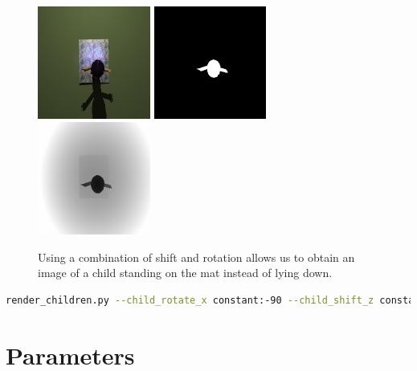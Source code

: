 \documentclass{article}
\begin{document}
\begin{figure}[htbp]
    \centering
    \includegraphics[height=3.7cm]{plots/child_000000_rgb_090c.png}
    \includegraphics[height=3.7cm]{plots/child_000000_seg_090c.png}
    \includegraphics[height=3.7cm]{plots/child_000000_dpt_090c.png}
    \caption{Using a combination of shift and rotation allows us to obtain an image of a child standing on the mat instead of lying down.}
    \label{fig:standing}
\end{figure}

\begin{lstlisting}[language=bash]
render_children.py --child_rotate_x constant:-90 --child_shift_z constant:0.9 --child_shift_y constant:0.4 --camera_distance constant:11\end{lstlisting}


\section{Parameters}
\end{document}
